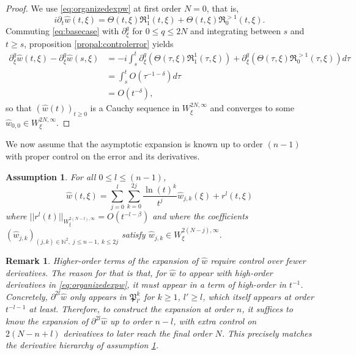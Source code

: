 \documentclass[a4paper, 15pt]{article}
\numberwithin{equation}{section}
\newtheorem{rem}[defi]{Remark}
\newtheorem{ass}[defi]{Assumption}
\begin{document}
\begin{proof}
We use \eqref{eq:organizedexpw} at first order $N=0$, that is, 
\begin{equation}
\label{eq:basecase}
    i\partial_t\hat{w}(t,\xi)=\Theta(t,\xi)\mathfrak{R}^1_{1}(t,\xi)+\Theta(t,\xi)\mathfrak{R}^{>1}_0(t,\xi).
\end{equation}
Commuting \eqref{eq:basecase} with $\partial^q_\xi$ for $0\leq q\leq 2N$ and integrating between $s$ and $t\geq s$, proposition \ref{propal:controlerror} yields
\begin{align*}
\partial^q_\xi\hat{w}(t,\xi)-\partial^q_\xi\hat{w}(s,\xi)&=-i\int^t_s\partial^q_\xi(\Theta(\tau,\xi)\mathfrak{R}^1_{1}(\tau,\xi))+\partial^q_\xi(\Theta(\tau,\xi)\mathfrak{R}^{>1}_0(\tau,\xi))d\tau\\
&=\int^t_s O(\tau^{-1-\delta})d\tau\\
&=O(t^{-\delta}),
\end{align*}
so that $(\hat{w}(t))_{t\geq0}$ is a Cauchy sequence in $W^{2N,\infty}_\xi$ and converges to some $\hat{w}_{0,0}\in W^{2N,\infty}_\xi$.
\end{proof}
We now assume that the asymptotic expansion is known up to order $(n-1)$ with proper control on the error and its derivatives.\\ 
\begin{ass}
\label{ass:lowerorderexpansion}
For all $0\leq l\leq(n-1)$, 
\begin{equation}
\label{eq:expansionn-un}
    \hat{w}(t,\xi)= \sum^{l}_{j=0}\sum^{2j}_{k=0}\frac{\ln(t)^k}{t^j}\hat{w}_{j,k}(\xi)+r^{l}(t,\xi)
\end{equation}
where $||r^l(t)||_{W^{2(N-l),\infty}_\xi}=O(t^{-l-\beta})$ and where the coefficients $(\hat{w}_{j,k})_{(j,k)\in\mathbb{N}^{2},\;j\leq n-1,\;k\leq 2j}$ satisfy $\hat{w}_{j,k}\in W^{2(N-j),\infty}_\xi$. \\
\end{ass}
 \begin{rem}
 \label{rem:limitexpansionderivw}
Higher-order terms of the expansion of $\hat{w}$ require control over fewer derivatives. The reason for that is that, for $\hat{w}$ to appear with high-order derivatives in \eqref{eq:organizedexpw}, it must appear in a term of high-order in $t^{-1}$. Concretely, $\partial^{2l}\hat{w}$ only appears in $\mathfrak{P}^k_{l'}$ for $k\geq1$, $l'\geq l$, which itself appears at order $t^{-l-1}$ at least. Therefore, to construct the expansion at order $n$, it suffices to know the expansion of $\partial^{2l}\hat{w}$ up to order $n-l$, with extra control on $2(N-n+l)$ derivatives to later reach the final order $N$. This precisely matches the derivative hierarchy of assumption \ref{ass:lowerorderexpansion}.\\
 \end{rem}
\end{document}
